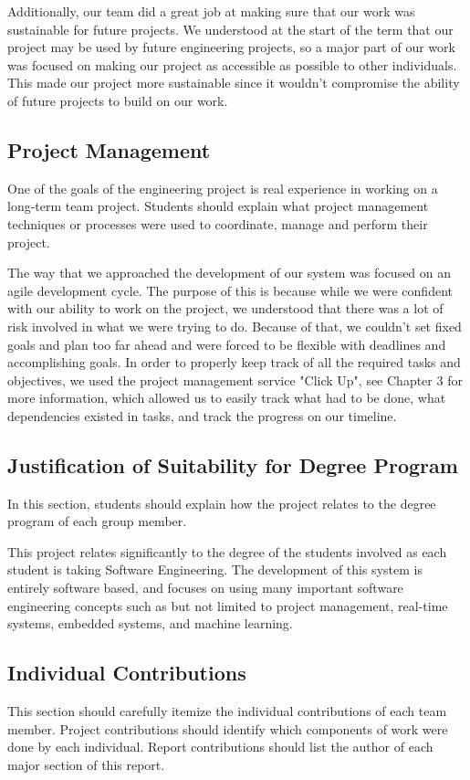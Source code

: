 \documentclass[titlepage]{article}
\begin{document}
Additionally, our team did a great job at making sure that our work was sustainable for future projects. We understood at the start of the term that our project may be used by future engineering projects, so a major part of our work was focused on making our project as accessible as possible to other individuals. This made our project more sustainable since it wouldn't compromise the ability of future projects to build on our work.

\subsection{Project Management}
One of the goals of the engineering project is real experience in working on a long-term team project. Students should explain what project management techniques or processes were used to coordinate, manage and perform their project.

The way that we approached the development of our system was focused on an agile development cycle. The purpose of this is because while we were confident with our ability to work on the project, we understood that there was a lot of risk involved in what we were trying to do. Because of that, we couldn't set fixed goals and plan too far ahead and were forced to be flexible with deadlines and accomplishing goals. In order to properly keep track of all the required tasks and objectives, we used the project management service "Click Up", see Chapter 3 for more information, which allowed us to easily track what had to be done, what dependencies existed in tasks, and track the progress on our timeline.

\subsection{Justification of Suitability for Degree Program}
In this section, students should explain how the project
relates to the degree program of each group member.

This project relates significantly to the degree of the students involved as each student is taking Software Engineering. The development of this system is entirely software based, and focuses on using many important software engineering concepts such as but not limited to project management, real-time systems, embedded systems, and machine learning.


\subsection{Individual Contributions}
This section should carefully itemize the individual contributions of each team member. Project contributions should identify which components of work were done by each  individual. Report contributions should list the author of  each major section of this report.
\end{document}
